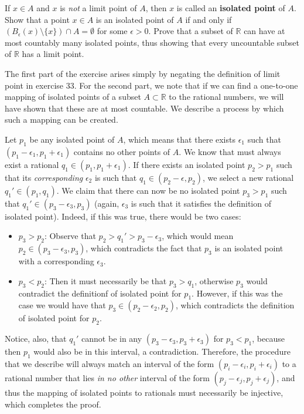 \begin{exercise}{40}
    If $x \in A$ and $x$ is \textit{not} a limit point of $A$, then $x$ is called an \textbf{isolated point} of $A$.
    Show that a point $x \in A$ is an isolated point of $A$ if and only if $(B_{\epsilon}(x) \setminus \{x\}) \cap A = \emptyset$ for some $\epsilon > 0$.
    Prove that a subset of $\mathbb{R}$ can have at most countably many isolated points, thus showing that every uncountable subset of $\mathbb{R}$ has a limit point.
\end{exercise}

\begin{solution}

    The first part of the exercise arises simply by negating the definition of limit point in exercise 33.
    For the second part, we note that if we can find a one-to-one mapping of isolated points of a subset $A \subset \mathbb{R}$ to the rational numbers, we will have shown that these are at most countable.
    We describe a process by which such a mapping can be created.

    Let $p_1$ be any isolated point of $A$, which means that there exists $\epsilon_1$ such that $(p_1 - \epsilon_1, p_1 + \epsilon_1)$ contains no other points of $A$.
    We know that must always exist a rational $q_1 \in (p_1, p_1 + \epsilon_1)$.
    If there exists an isolated point $p_2 > p_1$ such that its \textit{corresponding} $\epsilon_2$ is such that $q_1 \in (p_2 - \epsilon, p_2)$, we select a new rational $q_1' \in (p_1, q_1)$.
    We claim that there can now be no isolated point $p_3 > p_1$ such that $q_1' \in (p_3 - \epsilon_3, p_3)$ (again, $\epsilon_3$ is such that it satisfies the definition of isolated point).
    Indeed, if this was true, there would be two cases:
    \begin{itemize}
        \item $p_3 > p_2$: Observe that $p_2 > q_1' > p_3 - \epsilon_3$, which would mean $p_2 \in (p_3 - \epsilon_3, p_3)$, which contradicts the fact that $p_3$ is an isolated point with a corresponding $\epsilon_3$.
        \item $p_3 < p_2$: Then it must necessarily be that $p_3 > q_1$, otherwise $p_3$ would contradict the definitionf of isolated point for $p_1$.
        However, if this was the case we would have that $p_3 \in (p_2 - \epsilon_2, p_2)$, which contradicts the definition of isolated point for $p_2$.
    \end{itemize}
    Notice, also, that $q_1'$ cannot be in any $(p_3 - \epsilon_3, p_3 + \epsilon_3)$ for $p_3 < p_1$, because then $p_1$ would also be in this interval, a contradiction.
    Therefore, the procedure that we describe will always match an interval of the form $(p_i - \epsilon_i, p_i + \epsilon_i)$ to a rational number that lies \textit{in no other} interval of the form $(p_j - \epsilon_j, p_j + \epsilon_j)$, and thus the mapping of isolated points to rationals must necessarily be injective, which completes the proof.


\end{solution}

